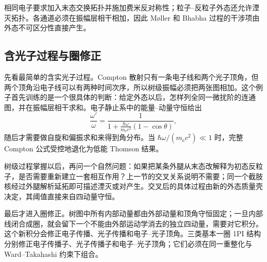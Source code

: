 相同电子要求加入末态交换拓扑并施加费米反对称性；粒子--反粒子外态还允许湮灭拓扑。各通道必须在振幅层相干相加，因此 M{\o}ller 和 Bhabha 过程的干涉项由外态不可区分性直接产生。





\subsection{含光子过程与圈修正}

先看最简单的含实光子过程。Compton 散射只有一条电子线和两个光子顶角，但两个顶角沿电子线可以有两种时间次序，所以树级振幅必须把两张图相加。这个例子首先训练的是一个很具体的判断：给定外态以后，怎样列全同一微扰阶的连通图，并在振幅层相干求和。电子静止系中的能量--动量守恒给出
\[
 \frac{\omega'}{\omega}
 =\frac{1}{1+\frac{\hbar\omega}{m_{\mathrm e} c^2}(1-\cos\theta)},
\]
随后才需要做自旋和偏振求和来得到角分布。当 $\hbar\omega/(m_{\mathrm e} c^2)\ll1$ 时，完整 Compton 公式受控地退化为低能 Thomson 结果。

树级过程掌握以后，再问一个自然问题：如果把某条外腿从末态改解释为初态反粒子，是否需要重新建立一套相互作用？上一节的交叉关系说明不需要；同一个截肢核经过外腿解析延拓即可描述湮灭或对产生。交叉后的具体过程由新的外态质量壳决定，其阈值直接来自四动量守恒。

最后才进入圈修正。树图中所有内部动量都由外部动量和顶角守恒固定；一旦内部线闭合成圈，就会留下一个不能由外部运动学消去的独立四动量，需要对它积分。这个新积分会修正电子传播、光子传播和电子--光子顶角。三类基本一圈 1PI 结构分别修正电子传播子、光子传播子和电子--光子顶角；它们必须在同一重整化与 Ward--Takahashi 约束下组合。


















